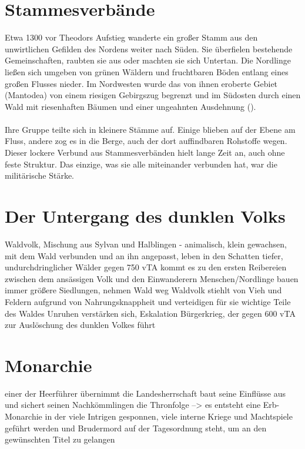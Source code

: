 \section{Stammesverbände}
Etwa 1300 vor Theodors Aufstieg wanderte ein großer Stamm aus den unwirtlichen Gefilden des Nordens weiter nach Süden.
Sie überfielen bestehende Gemeinschaften, raubten sie aus oder machten sie sich Untertan.
Die Nordlinge ließen sich umgeben von grünen Wäldern und fruchtbaren Böden entlang eines großen Flusses nieder.
Im Nordwesten wurde das von ihnen eroberte Gebiet (Mantodea) von einem riesigen Gebirgszug begrenzt und im Südosten durch einen Wald mit riesenhaften Bäumen und einer ungeahnten Ausdehnung ().\\
\\
Ihre Gruppe teilte sich in kleinere Stämme auf.
Einige blieben auf der Ebene am Fluss, andere zog es in die Berge, auch der dort auffindbaren Rohstoffe wegen.
Dieser lockere Verbund aus Stammesverbänden hielt lange Zeit an, auch ohne feste Struktur.
Das einzige, was sie alle miteinander verbunden hat, war die militärische Stärke.

\section{Der Untergang des dunklen Volks}
\begin{outline}
	\1 Waldvolk, Mischung aus Sylvan und Halblingen - animalisch, klein gewachsen, mit dem Wald verbunden und an ihn angepasst, leben in den Schatten tiefer, undurchdringlicher Wälder
	\1 gegen 750 vTA kommt es zu den ersten Reibereien zwischen dem ansässigen Volk und den Einwanderern
	\1 Menschen/Nordlinge bauen immer größere Siedlungen, nehmen Wald weg
	\1 Waldvolk stiehlt von Vieh und Feldern aufgrund von Nahrungsknappheit und verteidigen für sie wichtige Teile des Waldes
	\1 Unruhen verstärken sich, Eskalation
	\1 Bürgerkrieg, der gegen 600 vTA zur Auslöschung des dunklen Volkes führt
\end{outline}

\section{Monarchie}
\begin{outline}
	\1 einer der Heerführer übernimmt die Landesherrschaft
	\1 baut seine Einflüsse aus und sichert seinen Nachkömmlingen die Thronfolge --> es entsteht eine Erb-Monarchie in der viele Intrigen gesponnen, viele interne Kriege und Machtspiele geführt werden und Brudermord auf der Tagesordnung steht, um an den gewünschten Titel zu gelangen
\end{outline}

